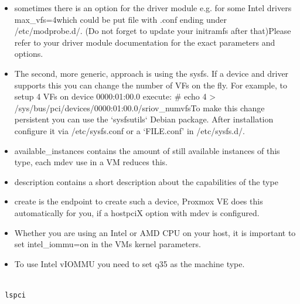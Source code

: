 \begin{itemize}[leftmargin=2cm]

	\item sometimes there is an option for the driver module e.g. for some Intel drivers max_vfs=4which could be put file with .conf ending under /etc/modprobe.d/. (Do not forget to update your initramfs after that)Please refer to your driver module documentation for the exact parameters and options.

	\item The second, more generic, approach is using the sysfs. If a device and driver supports this you can change the number of VFs on the fly. For example, to setup 4 VFs on device 0000:01:00.0 execute: # echo 4 > /sys/bus/pci/devices/0000:01:00.0/sriov_numvfsTo make this change persistent you can use the ‘sysfsutils` Debian package. After installation configure it via /etc/sysfs.conf or a `FILE.conf’ in /etc/sysfs.d/.

\end{itemize}

\begin{itemize}[leftmargin=2cm]

	\item available_instances contains the amount of still available instances of this type, each mdev use in a VM reduces this.

	\item description contains a short description about the capabilities of the type

	\item create is the endpoint to create such a device, Proxmox VE does this automatically for you, if a hostpciX option with mdev is configured.

\end{itemize}

\begin{itemize}[leftmargin=2cm]

	\item Whether you are using an Intel or AMD CPU on your host, it is important to set intel_iommu=on in the VMs kernel parameters.

	\item To use Intel vIOMMU you need to set q35 as the machine type.

\end{itemize}

\begin{lstlisting}

 lspci

\end{lstlisting}

